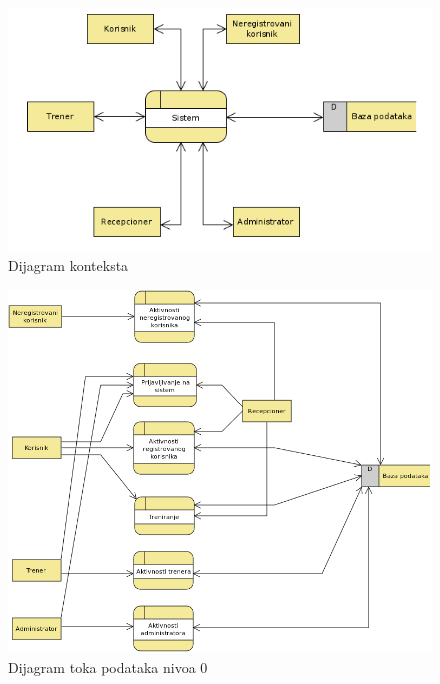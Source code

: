 \begin{figure}[!ht]
\begin{center}
\includegraphics[scale=0.55]{sections/images/dijagram_konteksta.png}
\end{center}
\caption{Dijagram konteksta}
\label{fig:kontekst}
\end{figure}

\begin{figure}[!htb]
\begin{center}
\includegraphics[scale=0.55]{sections/images/dijagram_toka_podataka_nivoa_0.png}
\end{center}
\caption{Dijagram toka podataka nivoa 0}
\label{fig:tokPodatakaNivo0}
\end{figure}